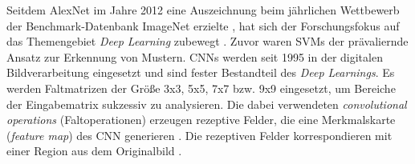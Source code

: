 Seitdem \gls{AlexNet} im Jahre 2012 eine Auszeichnung beim jährlichen Wettbewerb der Benchmark-Datenbank ImageNet erzielte \cite{imagenet}, hat sich der Forschungsfokus auf das Themengebiet \emph{Deep Learning} zubewegt \cites{NIPS2012_c399862d, rastegari2016xnornet, russakovsky2015imagenet}. Zuvor waren \acp{SVM} der prävaliernde Ansatz zur Erkennung von Mustern. \acp{CNN} werden seit 1995 in der digitalen Bildverarbeitung eingesetzt und sind fester Bestandteil des \emph{Deep Learnings}. Es werden Faltmatrizen der Größe 3x3, 5x5, 7x7 bzw. 9x9 eingesetzt, um Bereiche der Eingabematrix sukzessiv zu analysieren. Die dabei verwendeten \emph{convolutional operations} (Faltoperationen) erzeugen rezeptive Felder, die eine Merkmalskarte (\emph{feature map}) des \ac{CNN} generieren \cite{russakovsky2015imagenet}. Die rezeptiven Felder korrespondieren mit einer Region aus dem Originalbild \cite{Yan2020}. 
\usetikzlibrary{matrix,positioning}
